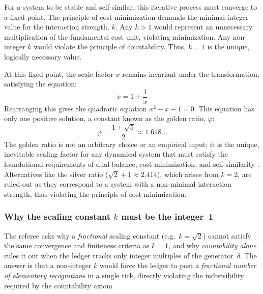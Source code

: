For a system to be stable and self-similar, this iterative process must converge to a fixed point. The principle of cost minimization demands the minimal integer value for the interaction strength, \(k\). Any \(k>1\) would represent an unnecessary multiplication of the fundamental cost unit, violating minimization. Any non-integer \(k\) would violate the principle of countability. Thus, \(k=1\) is the unique, logically necessary value.

At this fixed point, the scale factor \(x\) remains invariant under the transformation, satisfying the equation:
\begin{equation}
x = 1 + \frac{1}{x}
\end{equation}
Rearranging this gives the quadratic equation \(x^2 - x - 1 = 0\). This equation has only one positive solution, a constant known as the golden ratio, \(\varphi\):
\begin{equation}
\varphi = \frac{1 + \sqrt{5}}{2} \approx 1.618...
\end{equation}
The golden ratio is not an arbitrary choice or an empirical input; it is the unique, inevitable scaling factor for any dynamical system that must satisfy the foundational requirements of dual-balance, cost minimization, and self-similarity \parencite{Livio2002}. Alternatives like the silver ratio (\(\sqrt{2}+1 \approx 2.414\)), which arises from \(k=2\), are ruled out as they correspond to a system with a non-minimal interaction strength, thus violating the principle of cost minimization.

\subsubsection*{Why the scaling constant \texorpdfstring{$k$}{k} must be the integer 1}

The referee asks why a \emph{fractional} scaling constant
(e.g.\ $k=\sqrt2$) cannot satisfy the same convergence and finiteness
criteria as $k=1$, and why \textit{countability alone}
rules it out when the ledger tracks only integer multiples of the
generator $\delta$.  
The answer is that a non‑integer $k$ would force the ledger to post
a \emph{fractional number of elementary recognitions} in a single
tick, directly violating the indivisibility required by the
countability axiom.

